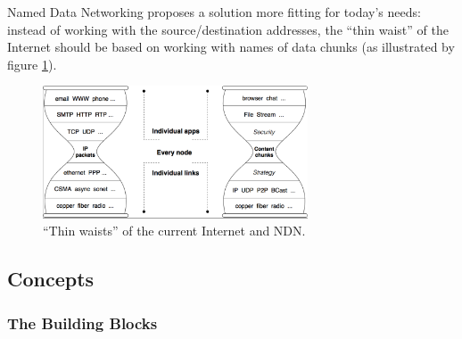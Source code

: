             Named Data Networking proposes a solution more fitting for today's needs: instead of working with the source/destination addresses, the ``thin waist'' of the Internet should be based on working with names of data chunks (as illustrated by figure \ref{fig:ndn_waist}).

            \begin{figure}[H]
                \begin{center}
                    \includegraphics[width=0.7\textwidth]{fig/archs_ndn-hourglass.png}
                  \caption{``Thin waists'' of the current Internet and NDN.}
                  \label{fig:ndn_waist}
                \end{center}
            \end{figure}

        \subsection{Concepts}

            \subsubsection{The Building Blocks}

